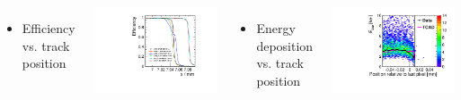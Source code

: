 \begin{frame}
  \begin{columns}[t]
    
    \begin{itemize}
    \item Efficiency vs. track position
    \end{itemize}
    \centering
    \includegraphics[width=\textwidth, page=6]{../figures/TestBeam/edge_bcp.pdf}
    
    \begin{itemize}
    \item Energy deposition vs. track position
    \end{itemize}
    \centering
    \includegraphics[width=\textwidth]{../figures/ActiveEdge/23_FGR_Edep_TCAD_data.pdf}

  \end{columns}

\end{frame}


